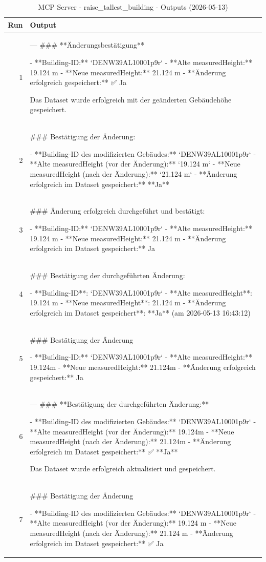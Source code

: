 \documentclass[a4paper,11pt]{article}
\begin{document}
\begin{table}[ht]
\centering
\scriptsize
\caption{MCP Server - raise\_tallest\_building - Outputs (2026-05-13)}
\label{tab:mcp\_raise\_tallest\_building\_outputs\_2026-05-13}
\begin{tabular}{r p{12cm}}
\hline
Run & Output \\
\hline
1 & ---
\#\#\# **Änderungsbestätigung**

- **Building-ID:** `DENW39AL10001p9r`
- **Alte measuredHeight:** 19.124 m
- **Neue measuredHeight:** 21.124 m
- **Änderung erfolgreich gespeichert:** ✅ Ja

Das Dataset wurde erfolgreich mit der geänderten Gebäudehöhe gespeichert. \\
2 & \#\#\# Bestätigung der Änderung:

- **Building-ID des modifizierten Gebäudes:** `DENW39AL10001p9r`
- **Alte measuredHeight (vor der Änderung):** `19.124 m`
- **Neue measuredHeight (nach der Änderung):** `21.124 m`
- **Änderung erfolgreich im Dataset gespeichert:** **Ja** \\
3 & \#\#\# Änderung erfolgreich durchgeführt und bestätigt:

- **Building-ID:** `DENW39AL10001p9r`
- **Alte measuredHeight:** 19.124 m
- **Neue measuredHeight:** 21.124 m
- **Änderung erfolgreich im Dataset gespeichert:** Ja \\
4 & \#\#\# Bestätigung der durchgeführten Änderung:

- **Building-ID**: `DENW39AL10001p9r`
- **Alte measuredHeight**: 19.124 m
- **Neue measuredHeight**: 21.124 m
- **Änderung erfolgreich im Dataset gespeichert**: **Ja** (am 2026-05-13 16:43:12) \\
5 & \#\#\# Bestätigung der Änderung

- **Building-ID:** `DENW39AL10001p9r`
- **Alte measuredHeight:** 19.124m
- **Neue measuredHeight:** 21.124m
- **Änderung erfolgreich gespeichert:** Ja \\
6 & ---
\#\#\# **Bestätigung der durchgeführten Änderung:**

- **Building-ID des modifizierten Gebäudes:** `DENW39AL10001p9r`
- **Alte measuredHeight (vor der Änderung):** 19.124m
- **Neue measuredHeight (nach der Änderung):** 21.124m
- **Änderung erfolgreich im Dataset gespeichert:** ✅ **Ja**

Das Dataset wurde erfolgreich aktualisiert und gespeichert. \\
7 & \#\#\# Bestätigung der Änderung

- **Building-ID des modifizierten Gebäudes:** `DENW39AL10001p9r`
- **Alte measuredHeight (vor der Änderung):** 19.124 m
- **Neue measuredHeight (nach der Änderung):** 21.124 m
- **Änderung erfolgreich im Dataset gespeichert:** ✅ Ja


\end{tabular}
\end{table}
\end{document}
